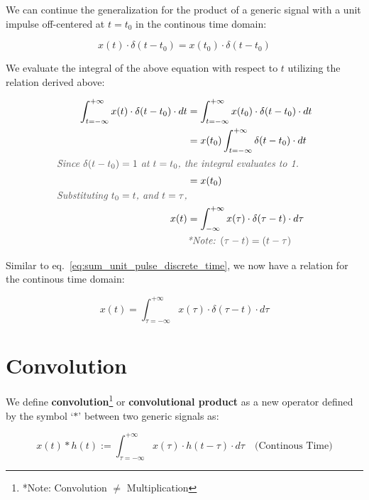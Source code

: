 \documentclass[letterpaper,12pt]{article}
\newcommand{\annot}[1]{\textcolor{darkgray}{\textit{#1}}}
\begin{document}
We can continue the generalization for the product of a generic signal with a
unit impulse off-centered at $t=t_{0}$ in the continous time domain:

\[x(t) \cdot \delta(t-t_{0}) = x(t_{0}) \cdot \delta(t-t_{0})\]

We evaluate the integral of the above equation with respect to $t$ utilizing
the relation derived above:

\begin{align*}
    \int_{t=-\infty}^{+\infty} x(t) \cdot \delta(t-t_{0})\cdot dt & = \int_{t=-\infty}^{+\infty} x(t_{0}) \cdot \delta(t-t_{0})\cdot dt \\
                                                                  & =x(t_{0})\int_{t=-\infty}^{+\infty} \delta(t-t_{0})\cdot dt         \\
    \intertext{\annot{Since $\delta(t-t_0) = 1$ at $t=t_{0}$, the integral evaluates to 1.}}
                                                                  & = x(t_{0})
    \\
    \annot{Substituting $t_{0}=t$, and $t=\tau$,}
    \\
    x(t)                                                          & = \int_{-\infty}^{+\infty} x(\tau) \cdot \delta(\tau-t)\cdot d\tau  \\
                                                                  & \annot{*Note: $ (\tau-t) = (t-\tau)$}
\end{align*}

Similar to eq.~\ref{eq:sum_unit_pulse_discrete_time}, we now have a relation
for the continous time domain:

\begin{equation}
    \label{eq:sum_unit_pulse_cont_time}
    x(t) = \int_{\tau=-\infty}^{+\infty} x(\tau) \cdot \delta(\tau-t)\cdot d\tau
\end{equation}

\section{Convolution}
We define \textbf{convolution}\footnote{*Note: Convolution $\neq$
    Multiplication} or \textbf{convolutional product} as a new operator defined by
the symbol `$*$' between two generic signals as:

\begin{equation}
    x(t) * h(t) := \int_{\tau=-\infty}^{+\infty} x(\tau) \cdot h(t-\tau)\cdot d\tau \quad \text{(Continous Time)}
    \label{eq:convolution_continous_time}
\end{equation}
\end{document}
